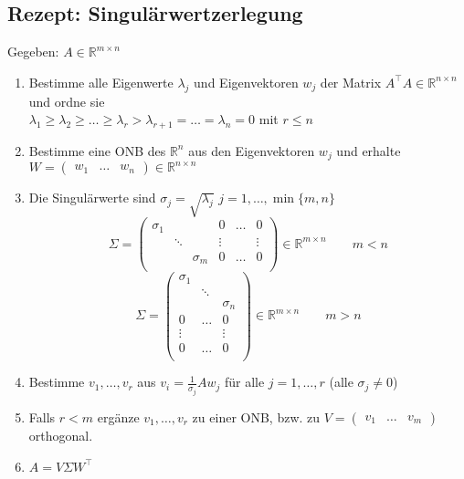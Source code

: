 \documentclass[german, 6pt]{latex4ei/latex4ei_sheet}
\begin{document}
\subsection{Rezept: Singulärwertzerlegung}
Gegeben: $A\in \mathbb{R}^{m\times n}$
\begin{enumerate}\itemsep0pt
\item Bestimme alle Eigenwerte $\lambda_j$ und Eigenvektoren $w_j$ der Matrix $A^\top A\in \mathbb{R}^{n\times n}$ und ordne sie \\ $\lambda_1\ge\lambda_2\ge \dots \ge \lambda_r>\lambda_{r+1}=\dots=\lambda_n=0$ mit $r\le n$
\item Bestimme eine ONB des $\mathbb{R}^n$ aus den Eigenvektoren $w_j$ und erhalte $W=\begin{pmatrix} 
w_1 &\dots & w_n
\end{pmatrix} \in \mathbb{R}^{n\times n}$
\item Die Singulärwerte sind $\sigma_j=\sqrt{\lambda_j}$ \qquad $j=1,\dots,\min\{m,n\}$
\begin{equation*}
\Sigma=\begin{pmatrix}
\sigma_1 & & & 0 & \dots & 0\\
 & \ddots & &  \vdots &  &  \vdots\\
& & \sigma_m & 0 & \dots & 0\\
\end{pmatrix} \in \mathbb{R}^{m\times n}
\qquad m<n
\end{equation*}
\begin{equation*}
\Sigma=\begin{pmatrix}
\sigma_1 & & \\
 & \ddots & \\
& & \sigma_n \\
0 & \dots & 0\\
\vdots &  &  \vdots\\
0 & \dots & 0\\
\end{pmatrix} \in \mathbb{R}^{m\times n}
\qquad m>n
\end{equation*}
\item Bestimme $v_1,\dots,v_r$ aus $v_i=\frac{1}{\sigma_j}Aw_j$ für alle $j=1,\dots,r$ (alle $\sigma_j\ne 0$)
\item Falls $r<m$ ergänze $v_1,\dots,v_r$ zu einer ONB, bzw. zu $V=\begin{pmatrix}
v_1 & \dots & v_m
\end{pmatrix}$
orthogonal.
\item $A=V\Sigma W^\top$
\end{enumerate}
\end{document}
